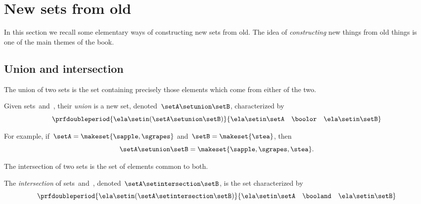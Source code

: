 
\section{New sets from old}

In this section we recall some elementary ways of constructing new sets from old.
%
The idea of \emph{constructing} new things from old things is one of the main themes of the book.

\subsection{Union and intersection}
The union of two sets is the set containing precisely those elements which come from either of the two.
\begin{ctdefinition}
    \label{def:union-of-sets}
    Given sets~\setA and~\setB, their \emph{union} is a new set, denoted~$\setA \setunion \setB$, characterized by
    \begin{equation}
        \prfdoubleperiod{
            \ela \setin(\setA \setunion \setB)
        }{
            \ela \setin\setA \quad \boolor \quad \ela \setin\setB
        }
    \end{equation}
\end{ctdefinition}

For example, if~$\setA = \makeset{ \sapple, \sgrapes }$ and~$\setB = \makeset{ \stea }$, then
\begin{equation}
    \setA \setunion \setB = \makeset{ \sapple, \sgrapes, \stea }.
\end{equation}


The intersection of two sets is the set of elements common to both.

\begin{ctdefinition}
    \label{def:intersection-of-sets}
    The \emph{intersection} of sets~\setA and~\setB, denoted~$\setA \setintersection \setB$, is the set characterized by
    \begin{equation}
        \prfdoubleperiod{
            \ela \setin(\setA \setintersection \setB)
        }{
            \ela \setin\setA \quad \booland \quad \ela \setin\setB
        }
    \end{equation}
\end{ctdefinition}

